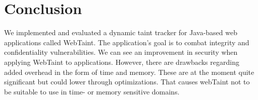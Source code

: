 \chapter{Conclusion}
\label{Conclusion}
We implemented and evaluated a dynamic taint tracker for Java-based web applications called WebTaint. The application's goal is to combat integrity and confidentiality vulnerabilities. We can see an improvement in security when applying WebTaint to applications. However, there are drawbacks regarding added overhead in the form of time and memory. These are at the moment quite significant but could lower through optimizations. That causes webTaint not to be suitable to use in time- or memory sensitive domains.